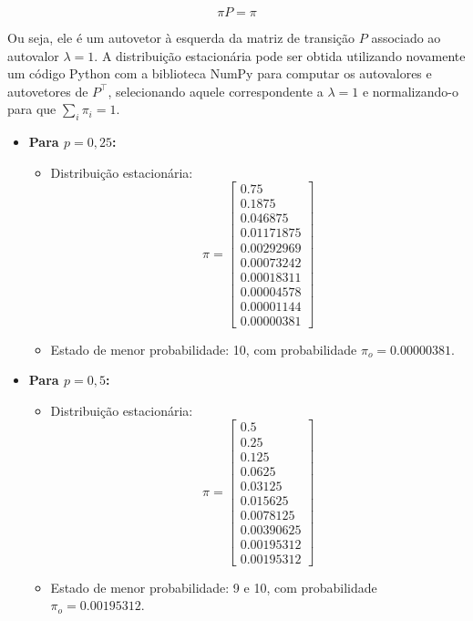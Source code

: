 \begin{enumerate}
\begin{resposta}
        $$ \pi P = \pi $$

        Ou seja, ele é um autovetor à esquerda da matriz de transição $P$ associado ao autovalor $\lambda = 1$. 
        A distribuição estacionária pode ser obtida utilizando novamente um código Python com a biblioteca NumPy para computar os autovalores e autovetores de $P^\top$, selecionando aquele correspondente a $\lambda = 1$ e normalizando-o para que $\sum_i \pi_i = 1$.

        \begin{itemize}
            \item \textbf{Para $p = 0{,}25$:}
            \begin{itemize}
                \item Distribuição estacionária:
                $$
                \pi = 
                \begin{bmatrix}
                0.75 \\
                0.1875 \\
                0.046875 \\
                0.01171875 \\
                0.00292969 \\
                0.00073242 \\
                0.00018311 \\
                0.00004578 \\
                0.00001144 \\
                \boxed{0.00000381}
                \end{bmatrix}
                $$
                \item Estado de menor probabilidade: 10, com probabilidade $\pi_o = 0.00000381$.
            \end{itemize}

            \newpage
            \item \textbf{Para $p = 0{,}5$:}
            \begin{itemize}
                \item Distribuição estacionária:
                $$
                \pi = 
                \begin{bmatrix}
                0.5 \\
                0.25 \\
                0.125 \\
                0.0625 \\
                0.03125 \\
                0.015625 \\
                0.0078125 \\
                0.00390625 \\
                \boxed{0.00195312} \\
                \boxed{0.00195312}
                \end{bmatrix}
                $$
                \item Estado de menor probabilidade: 9 e 10, com probabilidade $\pi_o = 0.00195312$.
            \end{itemize}


\end{itemize}
\end{resposta}
\end{enumerate}
